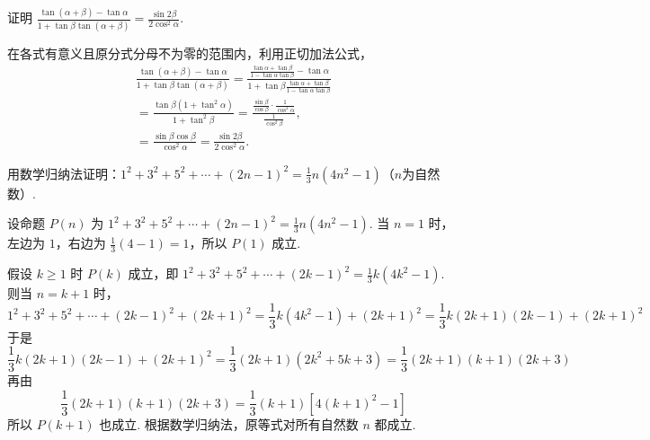 \begin{problem}

证明 \(\frac{\tan(\alpha + \beta) - \tan\alpha}{1 + \tan\beta\tan(\alpha + \beta)} = \frac{\sin 2\beta}{2\cos^2\alpha}\).

\begin{solution}
在各式有意义且原分式分母不为零的范围内，利用正切加法公式，
\[
\begin{gathered}
\frac{\tan(\alpha + \beta) - \tan\alpha}{1 + \tan\beta\tan(\alpha + \beta)}
= \frac{\frac{\tan\alpha+\tan\beta}{1-\tan\alpha\tan\beta}-\tan\alpha}{1+\tan\beta\frac{\tan\alpha+\tan\beta}{1-\tan\alpha\tan\beta}}\\
= \frac{\tan\beta(1+\tan^{2}\alpha)}{1+\tan^{2}\beta}
= \frac{\frac{\sin\beta}{\cos\beta}\cdot\frac{1}{\cos^{2}\alpha}}{\frac{1}{\cos^{2}\beta}},\\
= \frac{\sin\beta\cos\beta}{\cos^{2}\alpha}
= \frac{\sin 2\beta}{2\cos^{2}\alpha}.
\end{gathered}
\]
\end{solution}
\end{problem}

\begin{problem}

用数学归纳法证明：\(1^{2}+3^{2}+5^{2}+\cdots+(2n-1)^{2}=\frac{1}{3}n(4n^{2}-1)\)（\(n\)为自然数）.

\begin{solution}
设命题 \(P(n)\) 为 \(1^{2}+3^{2}+5^{2}+\cdots+(2n-1)^{2}=\frac13n(4n^{2}-1)\). 当 \(n=1\) 时，左边为 \(1\)，右边为 \(\frac13(4-1)=1\)，所以 \(P(1)\) 成立.

假设 \(k\geqslant1\) 时 \(P(k)\) 成立，即
\(1^{2}+3^{2}+5^{2}+\cdots+(2k-1)^{2}=\frac13k(4k^{2}-1)\). 则当 \(n=k+1\) 时，
\[
1^{2}+3^{2}+5^{2}+\cdots+(2k-1)^{2}+(2k+1)^{2}
= \frac13k(4k^{2}-1)+(2k+1)^{2}
= \frac13k(2k+1)(2k-1)+(2k+1)^{2}
\]
于是
\[
\frac13k(2k+1)(2k-1)+(2k+1)^{2}
= \frac13(2k+1)(2k^{2}+5k+3)
= \frac13(2k+1)(k+1)(2k+3)
\]
再由
\[
\frac13(2k+1)(k+1)(2k+3)
= \frac13(k+1)\left[4(k+1)^{2}-1\right]
\]
所以 \(P(k+1)\) 也成立. 根据数学归纳法，原等式对所有自然数 \(n\) 都成立.
\end{solution}
\end{problem}

